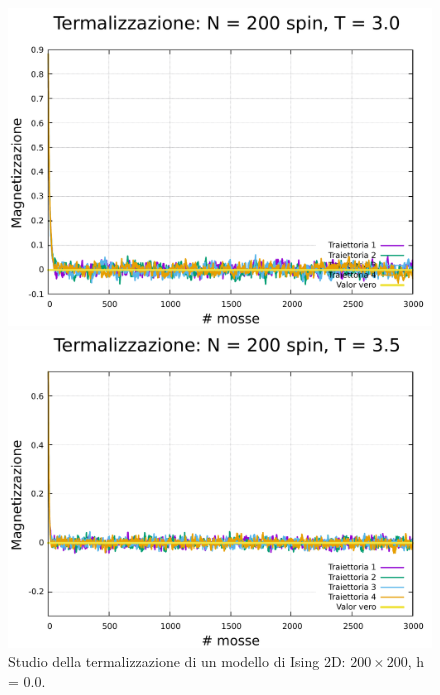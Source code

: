 \begin{figure}[H]
    \begin{minipage}{0.45\textwidth}  
        \centering
        \includegraphics[page=1, width=\textwidth]{Immagini/simIsing2D/metro/term/term_200_3.0.pdf}
        \caption{$T\,=\,3.0$}
      \end{minipage}\hfill
      \begin{minipage}{0.45\textwidth}  
        \centering
        \includegraphics[page=1, width=\textwidth]{Immagini/simIsing2D/metro/term/term_200_3.5.pdf}
        \caption{$T\,=\,3.5$}
    \end{minipage}

    \caption{Studio della termalizzazione di un modello di Ising 2D: $200 \times 200$, h = 0.0.}
\end{figure}

